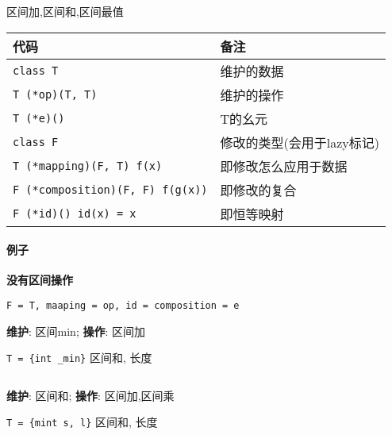 区间加,区间和,区间最值

\begin{tabular}{ll}
    \hline
    代码                                  & 备注                       \\
    \hline
    \verb|class T|                        & 维护的数据                 \\
    \verb|T (*op)(T, T)|                  & 维护的操作                 \\
    \verb|T (*e)()|                       & T的幺元                    \\
    \verb|class F|                        & 修改的类型(会用于lazy标记) \\
    \verb|T (*mapping)(F, T) f(x)|        & 即修改怎么应用于数据       \\
    \verb|F (*composition)(F, F) f(g(x))| & 即修改的复合               \\
    \verb|F (*id)() id(x) = x|            & 即恒等映射                 \\
    \hline
\end{tabular}

\paragraph{例子}

\textbf{没有区间操作}

\verb|F = T, maaping = op, id = composition = e|

\textbf{维护}: 区间min; \textbf{操作}: 区间加

\verb|T = {int _min}| 区间和, 长度

\inputminted{cpp}{src/src/segtree_eg1.txt}

\textbf{维护}: 区间和; \textbf{操作}: 区间加,区间乘

\verb|T = {mint s, l}| 区间和, 长度

\inputminted{cpp}{src/src/segtree_eg2.txt}
